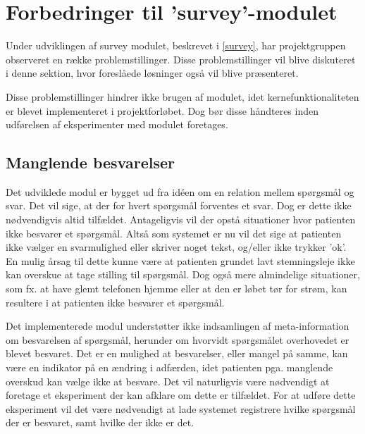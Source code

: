 
\section{Forbedringer til 'survey'-modulet}
Under udviklingen af survey modulet, beskrevet i \cref{survey}, har projektgruppen observeret en række problemstillinger.
Disse problemstillinger vil blive diskuteret i denne sektion, hvor foreslåede løsninger også vil blive præsenteret.

Disse problemstillinger hindrer ikke brugen af modulet, idet kernefunktionaliteten er blevet implementeret i projektforløbet.
Dog bør disse håndteres inden udførelsen af eksperimenter med modulet  foretages.

\subsection{Manglende besvarelser}
Det udviklede modul er bygget ud fra idéen om en relation mellem spørgsmål og svar.
Det vil sige, at der for hvert spørgsmål forventes et svar.
Dog er dette ikke nødvendigvis altid tilfældet.
Antageligvis vil der opstå situationer hvor patienten ikke besvarer et spørgsmål.
Altså som systemet er nu vil det sige at patienten ikke vælger en svarmulighed eller skriver noget tekst, og/eller ikke trykker 'ok'.
En mulig årsag til dette kunne være at patienten grundet lavt stemningsleje ikke kan overskue at tage stilling til spørgsmål.
Dog også mere almindelige situationer, som fx. at have glemt telefonen hjemme eller at den er løbet tør for strøm, kan resultere i at patienten ikke besvarer et spørgsmål.

Det implementerede modul understøtter ikke indsamlingen af meta-information om besvarelsen af spørgsmål, herunder om hvorvidt spørgsmålet overhovedet er blevet besvaret.
Det er en mulighed at besvarelser, eller mangel på samme, kan være en indikator på en ændring i adfærden, idet patienten pga. manglende overskud kan vælge ikke at besvare.
Det vil naturligvis være nødvendigt at foretage et eksperiment der kan afklare om dette er tilfældet.
For at udføre dette eksperiment vil det være nødvendigt at lade systemet registrere hvilke spørgsmål der er besvaret, samt hvilke der ikke er det.

